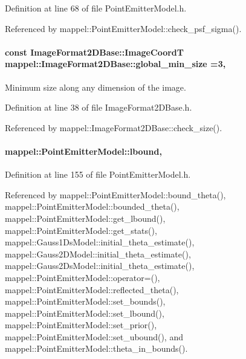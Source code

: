 Definition at line 68 of file Point\+Emitter\+Model.\+h.



Referenced by mappel\+::\+Point\+Emitter\+Model\+::check\+\_\+psf\+\_\+sigma().

\paragraph[{\texorpdfstring{global\+\_\+min\+\_\+size}{global_min_size}}]{\setlength{\rightskip}{0pt plus 5cm}const {\bf Image\+Format2\+D\+Base\+::\+Image\+CoordT} mappel\+::\+Image\+Format2\+D\+Base\+::global\+\_\+min\+\_\+size =3\hspace{0.3cm}{\ttfamily [static]}, {\ttfamily [inherited]}}\hypertarget{classmappel_1_1ImageFormat2DBase_a1149e8545d3cfaa40c2f3bc02e3223b2}{}\label{classmappel_1_1ImageFormat2DBase_a1149e8545d3cfaa40c2f3bc02e3223b2}
Minimum size along any dimension of the image. 

Definition at line 38 of file Image\+Format2\+D\+Base.\+h.



Referenced by mappel\+::\+Image\+Format2\+D\+Base\+::check\+\_\+size().

\paragraph[{\texorpdfstring{lbound}{lbound}}]{ mappel\+::\+Point\+Emitter\+Model\+::lbound\hspace{0.3cm}{\ttfamily [protected]}, {\ttfamily [inherited]}}\hypertarget{classmappel_1_1PointEmitterModel_a889bc82f74cfa654da121e5770296ab2}{}\label{classmappel_1_1PointEmitterModel_a889bc82f74cfa654da121e5770296ab2}


Definition at line 155 of file Point\+Emitter\+Model.\+h.



Referenced by mappel\+::\+Point\+Emitter\+Model\+::bound\+\_\+theta(), mappel\+::\+Point\+Emitter\+Model\+::bounded\+\_\+theta(), mappel\+::\+Point\+Emitter\+Model\+::get\+\_\+lbound(), mappel\+::\+Point\+Emitter\+Model\+::get\+\_\+stats(), mappel\+::\+Gauss1\+Ds\+Model\+::initial\+\_\+theta\+\_\+estimate(), mappel\+::\+Gauss2\+D\+Model\+::initial\+\_\+theta\+\_\+estimate(), mappel\+::\+Gauss2\+Ds\+Model\+::initial\+\_\+theta\+\_\+estimate(), mappel\+::\+Point\+Emitter\+Model\+::operator=(), mappel\+::\+Point\+Emitter\+Model\+::reflected\+\_\+theta(), mappel\+::\+Point\+Emitter\+Model\+::set\+\_\+bounds(), mappel\+::\+Point\+Emitter\+Model\+::set\+\_\+lbound(), mappel\+::\+Point\+Emitter\+Model\+::set\+\_\+prior(), mappel\+::\+Point\+Emitter\+Model\+::set\+\_\+ubound(), and mappel\+::\+Point\+Emitter\+Model\+::theta\+\_\+in\+\_\+bounds().

